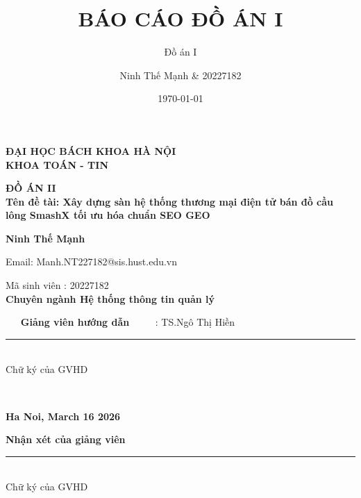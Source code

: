 \documentclass[13pt]{article}
\title{BÁO CÁO ĐỒ ÁN I}
\subtitle{Đồ án I}
\author{
   Ninh Thế Mạnh & 20227182\\  
}
\date{\today}
\begin{document}
\newpage
\newenvironment{coverpage}
\thispagestyle{empty}
\begin{titlepage}
	\begin{center}
		\vspace*{15pt}
		\Large{\textbf{ĐẠI HỌC BÁCH KHOA HÀ NỘI \\}}
        \Large{\textbf{KHOA TOÁN - TIN}}
		\vspace*{25pt}
		\centering
		\begin{figure}[h!]	

		\end{figure}
		\vspace*{150pt}
	
			{\fontsize{30pt}{36pt}\selectfont\textbf{ĐỒ ÁN II}}\\
			
            {\fontsize{18pt}{24pt}\selectfont\textbf{Tên đề tài: Xây dựng sàn hệ thống thương mại điện tử bán đồ cầu lông SmashX tối ưu hóa chuẩn SEO GEO }} \\
                \vspace{25pt}

                \textbf{ Ninh Thế Mạnh}
                \par Email: Manh.NT227182@sis.hust.edu.vn\\
                \par Mã sinh viên : 20227182\\
                \textbf{Chuyên ngành Hệ thống thông tin quản lý}
	\end{center}
	\vspace*{75pt}
\textcolor{white}{áda}\textbf{Giảng viên hướng dẫn} \textcolor{white}{ádass}: TS.Ngô Thị Hiền \textcolor{white}{sss}
\begin{minipage}[t]{0.3\textwidth}
    \centering
    \rule{5cm}{0.4pt} \\ %
    Chữ ký của GVHD
\end{minipage}\\


		\vspace{40pt}
		\begin{center}
		    	\large{\textbf{Ha Noi, March 16 2026}}
		\end{center}
	


\end{titlepage}
\newpage
\begin{center}
    \par \Large\textbf{Nhận xét của giảng viên}\\

\end{center}
\vspace{550pt}
\begin{flushright}
    \begin{minipage}{5cm} %
        \centering
        \rule{5cm}{0.4pt} \\
        Chữ ký của GVHD
    \end{minipage}
\end{flushright}
\end{document}
